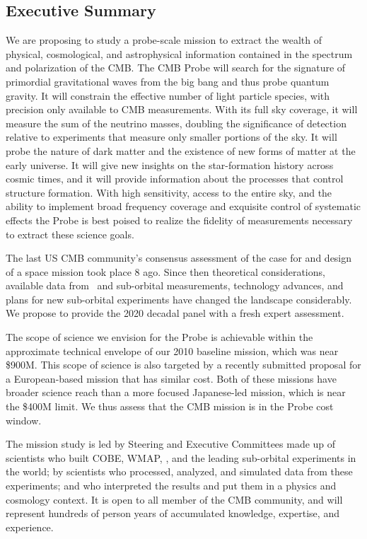 
\subsection{Executive Summary}
\label{sec:executive}

\vspace{-0.05in}

We are proposing to study a probe-scale mission to extract the wealth 
of physical, cosmological, and astrophysical information contained in the spectrum and polarization of the \ac{CMB}. 
The CMB Probe will search for the signature of primordial gravitational waves from the big bang 
and thus probe quantum gravity. It will constrain the effective 
number of light particle species, with precision only available to CMB measurements. 
With its full sky coverage, it will measure the sum of the neutrino masses, doubling the significance of detection 
relative to experiments that measure only smaller portions of the sky. It will probe 
the nature of dark matter and the existence of new forms of matter at the early universe.  It will 
give new insights on the star-formation history across cosmic times, and it will provide information about 
the processes that control structure formation. 
With high sensitivity, access to the entire sky, and the ability to implement broad frequency coverage 
and exquisite control of systematic effects the Probe is best poised to realize the fidelity of measurements 
necessary to extract these science goals. 

The last US CMB community's consensus assessment of the case for 
and design of a space mission took place 8 ago. %
Since then theoretical considerations, available data from \planck\ and sub-orbital measurements, technology advances, 
and plans for new sub-orbital experiments have changed the landscape considerably. 
We propose to provide the 2020 decadal panel with a fresh expert assessment. 

The scope of science we envision for the Probe is achievable within the approximate technical 
envelope of our 2010 baseline mission, which was near \$900M. This scope of science 
is also targeted by a recently submitted proposal for a European-based mission that has 
similar cost.  Both of these missions have broader science reach than a 
more focused Japanese-led mission, which 
is near the \$400M limit. We thus assess that the CMB mission is in the Probe cost window. 

The mission study is led by Steering 
and Executive Committees made up of scientists who built COBE, WMAP, \planck , and the 
leading sub-orbital experiments in the world; by scientists who processed, analyzed, and simulated data from 
these experiments; and who interpreted the results and put them in a physics and cosmology context. 
It is open to all member of the CMB community, and will represent hundreds of person years of 
accumulated knowledge, expertise, and experience. 

